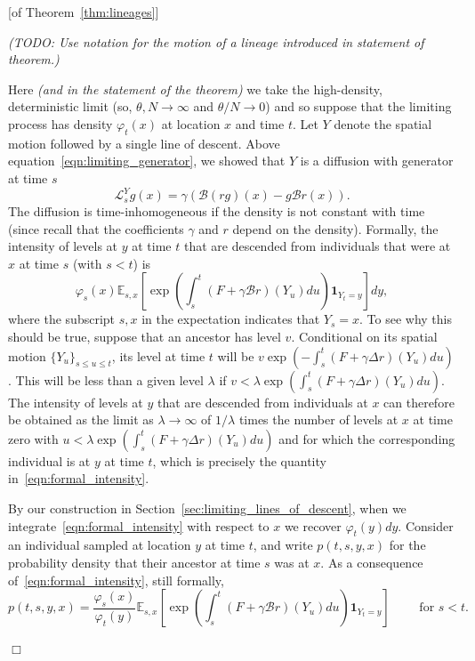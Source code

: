 \documentclass[12pt]{article}
\newenvironment {proof}{{\noindent\bf Proof }}{\hfill $\Box$ \medskip}
\newcommand{\IE}{\mathbb E}
\newcommand{\ind}{\mathbf{1}}
\newcommand{\DG}{\mathcal{B}}  %
\newcommand{\comment}[1]{{\color{blue} \it #1}}
\begin{document}
\begin{proof}[of Theorem~\ref{thm:lineages}]

\comment{(TODO: Use notation for the motion of a lineage introduced in statement of theorem.)}

Here
\comment{(and in the statement of the theorem)}
we take the high-density, deterministic limit
(so, $\theta, N \to \infty$ and $\theta/N \to 0$)
and so suppose that the limiting process has density $\varphi_t(x)$
at location $x$ and time $t$.
Let $Y$ denote the spatial motion followed by a single line of descent.
Above equation~\eqref{eqn:limiting_generator},
we showed that $Y$ is a diffusion with generator at time $s$
$$
    \mathcal{L}^Y_s g(x) = \gamma ( \DG(rg)(x) - g \DG r(x) ) .
$$
The diffusion is time-inhomogeneous if the density is not constant with time
(since recall that the coefficients $\gamma$ and $r$ depend on the density).
Formally, the intensity of levels at $y$ at time $t$
that are descended from individuals that were at $x$ at time $s$
(with $s < t$) is
\begin{equation} \label{eqn:formal_intensity}
    \varphi_s(x) \IE_{s,x} \left[
        \exp\left(
            \int_s^t (F + \gamma \DG r)(Y_u) du
        \right)
        \ind_{Y_t = y}
    \right]
    dy ,
\end{equation}
where the subscript $s, x$ in the expectation indicates that $Y_s = x$.
To see why this should be true, 
suppose that an ancestor has level $v$. Conditional on its 
spatial motion $\{Y_u\}_{s\leq u\leq t}$, its level at time $t$ will
be $v \exp(-\int_s^t(F+\gamma\Delta r)(Y_u)du)$. This will be less than a given level 
$\lambda$ if $v < \lambda \exp(\int_s^t(F+\gamma\Delta r)(Y_u)du)$. 
The intensity of levels at $y$ that are descended from individuals at
$x$ can therefore be obtained as the limit as $\lambda\to\infty$ of 
$1/\lambda$ times the number of levels at $x$ at time zero with
$u<\lambda \exp(\int_s^t(F+\gamma\Delta r)(Y_u)du)$ and for which
the corresponding individual is at $y$ at time $t$, which is 
precisely the quantity in~\eqref{eqn:formal_intensity}. 

By our construction in Section~\ref{sec:limiting_lines_of_descent},
when we integrate~\eqref{eqn:formal_intensity}
with respect to $x$ we recover $\varphi_t(y)dy$. 
Consider an individual sampled at location $y$ at time $t$,
and write $p(t,s,y,x)$ for the probability density
that their ancestor at time $s$ was at $x$.
As a consequence of~\eqref{eqn:formal_intensity},
still formally,
\begin{equation}
\label{eqn:ptsyx}
    p(t,s,y,x)
    =
    \frac{\varphi_s(x)}{\varphi_t(y)}
    \IE_{s,x}\left[
        \exp\left( \int_s^t (F + \gamma\DG r)(Y_u) du \right)
        \ind_{Y_t=y}
    \right]
\qquad \text{ for } s < t.
\end{equation}


\end{proof}
\end{document}
